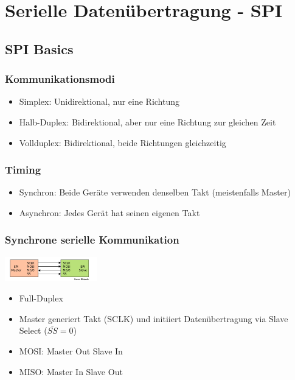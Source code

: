 \section{Serielle Datenübertragung - SPI}

\subsection{SPI Basics}
\subsubsection{Kommunikationsmodi}
\begin{itemize}
    \item Simplex: Unidirektional, nur eine Richtung
    \item Halb-Duplex: Bidirektional, aber nur eine Richtung zur gleichen Zeit
    \item Vollduplex: Bidirektional, beide Richtungen gleichzeitig
\end{itemize}

\subsubsection{Timing}
\begin{itemize}
    \item Synchron: Beide Geräte verwenden denselben Takt (meistenfalls Master)
    \item Asynchron: Jedes Gerät hat seinen eigenen Takt
\end{itemize}

\subsubsection{Synchrone serielle Kommunikation}
\includegraphics[width=0.3\textwidth]{sections/images/spi_synchron.png}
\begin{itemize}
    \item Full-Duplex
    \item Master generiert Takt (SCLK) und initiiert Datenübertragung via Slave Select ($\overline{SS}=0$)
    \item MOSI: Master Out Slave In
    \item MISO: Master In Slave Out
\end{itemize}

